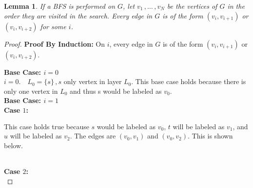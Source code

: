 \documentclass{article}
\theoremstyle{definition}
\theoremstyle{remark}
\theoremstyle{plain}
\newtheorem{lem}[thm]{Lemma}
\begin{document}
\begin{lem}
If a BFS is performed on $G$, let $v_1\,, \dots \,,v_N$ be the vertices of $G$ in the order they are visited in the search. Every edge in $G$ is of the form $(v_i, v_{i+1})$ or $(v_i, v_{i+2})$ for some $i$.
\end{lem}

\begin{proof}

\textbf{Proof By Induction:} On $i$, every edge in $G$ is of the form $(v_i, v_{i+1})$ or $(v_i, v_{i+2})$.

\textbf{Base Case: $i = 0$}\\
$i = 0.\quad L_0 = \{s\}\,,s$ only vertex in layer $L_0$. This base case holds because there is only one vertex in $L_0$ and thus s would be labeled as $v_0$. \\

\textbf{Base Case: $i = 1$}\\

\textbf{Case $1$:}\\

This case holds true because $s$ would be labeled as $v_0$, $t$ will be labeled as $v_1$, and $u$ will be labeled as $v_2$. The edges are $(v_0, v_1)$ and $(v_0, v_2)$.  This is shown below.\\

\\

\textbf{Case $2$:} \\

\end{proof}
\end{document}
